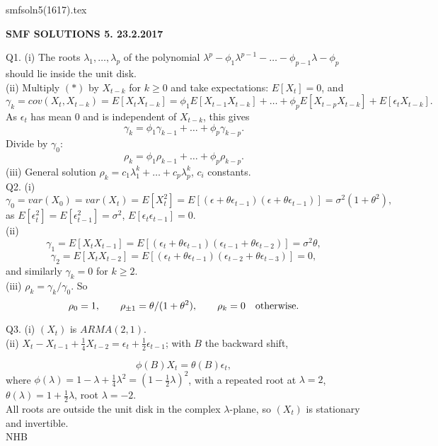 \documentclass[12pt]{article}
\begin{document}
\def\ni{\noindent}
\def\i{\indent}
\def\a{\alpha}
\def\b{\beta}
\def\e{\epsilon}
\def\d{\delta}
\def\g{\gamma}
\def\qq{\qquad}
\def\L{\Lambda}
\def\C{\cal C}
\def\E{\cal E}
\def\G{\Gamma}
\def\F{\cal F}
\def\K{\cal K}
\def\O{\cal O}
\def\A{\cal A}
\def\B{\cal B}
\def\S{\cal S}
\def\N{\cal N}
\def\M{\cal M}
\def\P{\cal P}
\def\Om{\Omega}
\def\om{\omega}
\def\s{\sigma}
\def\t{\theta}
\def\z{\zeta}
\def\p{\phi}
\def\m{\mu}
\def\n{\nu}
\def\b{\beta}
\def\e{\epsilon}
\def\l{\lambda}
\def\Si{\Sigma}
\def\half{\frac{1}{2}}
\def\hb{\hfil \break}
\ni smfsoln5(1617).tex \\
\begin{center}
{\bf SMF SOLUTIONS 5.  23.2.2017} \\
\end{center}


\ni Q1. (i) The roots ${\l}_1, \ldots, {\l}_p$ of the polynomial ${\l}^p - {\phi}_1 {\l}^{p-1} - \ldots - {\phi}_{p-1} \l - {\phi}_p$ should lie inside the unit disk. \\
(ii) Multiply $(\ast)$ by $X_{t-k}$ for $k \geq 0$ and take expectations: $E[X_t] = 0$, and
$$
{\g}_k = cov(X_t, X_{t-k}) = E[X_t X_{t-k}] = {\phi}_1 E[X_{t-1} X_{t-k}] + \ldots + {\phi}_p E[X_{t-p} X_{t-k}] + E[{\epsilon}_t X_{t-k}].
$$
As ${\epsilon}_t$ has mean 0 and is independent of $X_{t-k}$, this gives
$$
{\g}_k = {\phi}_1 {\g}_{k-1} + \ldots + {\phi}_p {\g}_{k-p}.
$$
Divide by ${\g}_0$:
$$
{\rho}_k = {\phi}_1 {\rho}_{k-1} + \ldots + {\phi}_p {\rho}_{k-p}.
$$
(iii) General solution ${\rho}_k = c_1 {\l}_1^k + \ldots + c_p {\l}_p^k$, $c_i$ constants. \\

\ni Q2. (i)
$$
{\g}_0 = var(X_0) = var(X_t) = E[X_t^2] = E[(\e + \t {\e}_{t-1})(\e + \t {\e}_{t-1})] = {\s}^2 (1 + {\t}^2),
$$
as $E[{\e}_t^2] = E[{\e}_{t-1}^2] = {\s}^2$, $E[{\e}_t {\e}_{t-1}] = 0$. \\
(ii)
$$
{\g}_1 = E[X_t X_{t-1}] = E[({\e}_t + \t {\e}_{t-1})({\e}_{t-1} + \t {\e}_{t-2})] = {\s}^2 \t,
$$
$$
{\g}_2 = E[X_t X_{t-2}] = E[({\e}_t + \t {\e}_{t-1})({\e}_{t-2} + \t {\e}_{t-3})] = 0,
$$
and similarly ${\g}_k = 0$ for $k \geq 2$. \\
(iii) ${\rho}_k = {\g}_k/{\g}_0$.  So
$$
{\rho}_0 = 1, \qquad {\rho}_{\pm 1} = \t/(1 + {\t}^2), \qquad {\rho}_k = 0 \quad \hbox{otherwise}.
$$

\ni Q3. (i) $(X_t)$ is $ARMA(2,1)$. \\
(ii) $X_t - X_{t-1} + \frac{1}{4} X_{t-2} = {\e}_t + \frac{1}{2}{\e}_{t-1}$; with $B$ the backward shift,

$$
\phi(B) X_t = \theta(B) {\e}_t,
$$
where $\phi(\l) = 1 - \l + \frac{1}{4} {\l}^2 = (1 - \frac{1}{2} \l)^2$, with a repeated root at $\l = 2$, \\
\i $\theta(\l) = 1 + \frac{1}{2}\l$, root $\l = -2$. \\
All roots are outside the unit disk in the complex $\l$-plane, so $(X_t)$ is stationary and invertible. \\

\hfil NHB \break
\end{document}
